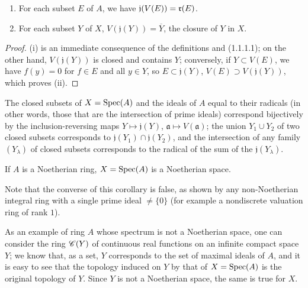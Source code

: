 \begin{proposition}[1.1.4]
\label{I.1.1.4}
\medskip\noindent
\begin{enumerate}
  \item[{\rm(i)}] For each subset $E$ of $A$, we have $\mathfrak{j}(V(E))=\mathfrak{r}(E)$.
  \item[{\rm(ii)}] For each subset $Y$ of $X$, $V(\mathfrak{j}(Y))=\overline{Y}$, the closure of $Y$ in $X$.
\end{enumerate}
\end{proposition}

\begin{proof}
(i) is an immediate consequence of the definitions and (1.1.1.1);
on the other hand, $V(\mathfrak{j}(Y))$ is closed and contains $Y$;
conversely, if $Y\subset V(E)$, we have $f(y)=0$ for $f\in E$ and all $y\in Y$, so $E\subset\mathfrak{j}(Y)$, $V(E)\supset V(\mathfrak{j}(Y))$, which proves (ii).
\end{proof}

\begin{corollary}[1.1.5]
\label{I.1.1.5}
The closed subsets of $X=\operatorname{Spec}(A)$ and the ideals of $A$ equal to their radicals (in other words, those that are the intersection of prime ideals) correspond bijectively by the inclusion-reversing maps $Y\mapsto\mathfrak{j}(Y)$, $\mathfrak{a}\mapsto V(\mathfrak{a})$;
the union $Y_1\cup Y_2$ of two closed subsets corresponds to $\mathfrak{j}(Y_1)\cap\mathfrak{j}(Y_2)$, and the intersection of any family $(Y_\lambda)$ of closed subsets corresponds to the radical of the sum of the $\mathfrak{j}(Y_\lambda)$.
\end{corollary}

\begin{corollary}[1.1.6]
\label{I.1.1.6}
If $A$ is a Noetherian ring, $X=\operatorname{Spec}(A)$ is a Noetherian space.
\end{corollary}

Note that the converse of this corollary is false, as shown by any non-Noetherian integral ring with a single prime ideal $\neq\{0\}$ (for example a nondiscrete valuation ring of rank $1$).

As an example of ring $A$ whose spectrum is not a Noetherian space, one can consider the ring $\mathscr{C}(Y)$ of continuous real functions on an infinite compact space $Y$;
we know that, as a set, $Y$ corresponds to the set of maximal ideals of $A$, and it is easy to see that the topology induced on $Y$ by that of $X=\operatorname{Spec}(A)$ is the original topology of $Y$.
Since $Y$ is not a Noetherian space, the same is true for $X$.

